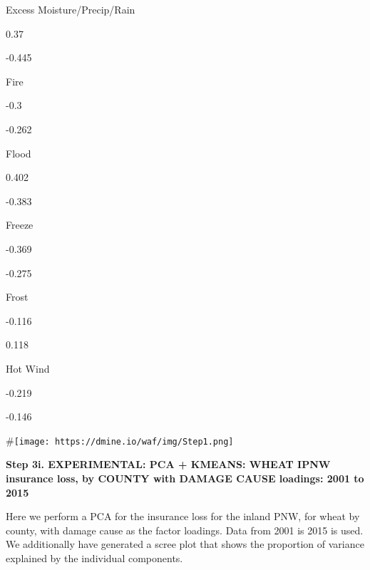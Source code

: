 \documentclass[]{article}
\begin{document}
Excess Moisture/Precip/Rain

0.37

-0.445

Fire

-0.3

-0.262

Flood

0.402

-0.383

Freeze

-0.369

-0.275

Frost

-0.116

0.118

Hot Wind

-0.219

-0.146

\#\texttt{[image: https://dmine.io/waf/img/Step1.png]}

\textbf{Step 3i. EXPERIMENTAL: PCA + KMEANS: WHEAT IPNW insurance loss,
by COUNTY with DAMAGE CAUSE loadings: 2001 to 2015}

Here we perform a PCA for the insurance loss for the inland PNW, for
wheat by county, with damage cause as the factor loadings. Data from
2001 is 2015 is used. We additionally have generated a scree plot that
shows the proportion of variance explained by the individual components.
\end{document}
